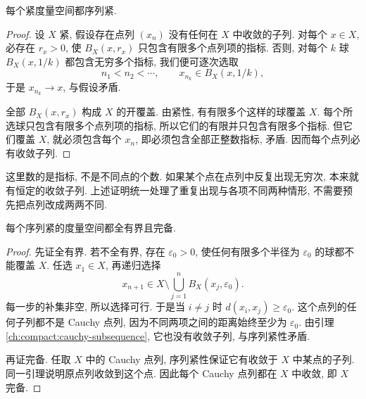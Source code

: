 \begin{theorem}[紧性推出序列紧]
\label{ch:compact:compact-to-sequential}
每个紧度量空间都序列紧.
\end{theorem}
\begin{proof}
设 $X$ 紧, 假设存在点列 $(x_n)$ 没有任何在 $X$ 中收敛的子列. 对每个 $x\in X$, 必存在 $r_x>0$, 使 $B_X(x,r_x)$ 只包含有限多个点列项的指标. 否则, 对每个 $k$ 球 $B_X(x,1/k)$ 都包含无穷多个指标, 我们便可逐次选取
\[
 n_1<n_2<\cdots,\qquad x_{n_k}\in B_X(x,1/k),
\]
于是 $x_{n_k}\to x$, 与假设矛盾.

全部 $B_X(x,r_x)$ 构成 $X$ 的开覆盖. 由紧性, 有有限多个这样的球覆盖 $X$. 每个所选球只包含有限多个点列项的指标, 所以它们的有限并只包含有限多个指标. 但它们覆盖 $X$, 就必须包含每个 $x_n$, 即必须包含全部正整数指标, 矛盾. 因而每个点列必有收敛子列.
\end{proof}

这里数的是指标, 不是不同点的个数. 如果某个点在点列中反复出现无穷次, 本来就有恒定的收敛子列. 上述证明统一处理了重复出现与各项不同两种情形, 不需要预先把点列改成两两不同.

\begin{proposition}[序列紧性推出全有界与完备]
\label{ch:compact:sequential-to-complete-total}
每个序列紧的度量空间都全有界且完备.
\end{proposition}
\begin{proof}
先证全有界. 若不全有界, 存在 $\varepsilon_0>0$, 使任何有限多个半径为 $\varepsilon_0$ 的球都不能覆盖 $X$. 任选 $x_1\in X$, 再递归选择
\[
 x_{n+1}\in X\setminus\bigcup_{j=1}^nB_X(x_j,\varepsilon_0).
\]
每一步的补集非空, 所以选择可行. 于是当 $i\ne j$ 时 $d(x_i,x_j)\geq\varepsilon_0$. 这个点列的任何子列都不是 Cauchy 点列, 因为不同两项之间的距离始终至少为 $\varepsilon_0$. 由引理 \ref{ch:compact:cauchy-subsequence}, 它也没有收敛子列, 与序列紧性矛盾.

再证完备. 任取 $X$ 中的 Cauchy 点列, 序列紧性保证它有收敛于 $X$ 中某点的子列. 同一引理说明原点列收敛到这个点. 因此每个 Cauchy 点列都在 $X$ 中收敛, 即 $X$ 完备.
\end{proof}

